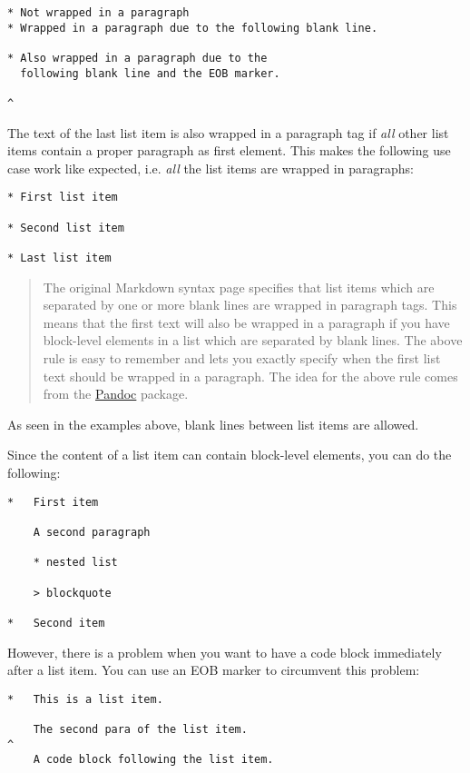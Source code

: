 \documentclass[a4paper]{article}
\begin{document}
\begin{verbatim}
* Not wrapped in a paragraph
* Wrapped in a paragraph due to the following blank line.

* Also wrapped in a paragraph due to the
  following blank line and the EOB marker.

^
\end{verbatim}

The text of the last list item is also wrapped in a paragraph tag if
\emph{all} other list items contain a proper paragraph as first element.
This makes the following use case work like expected, i.e. \emph{all}
the list items are wrapped in paragraphs:

\begin{verbatim}
* First list item

* Second list item

* Last list item
\end{verbatim}

\begin{quote}
The original Markdown syntax page specifies that list items which are
separated by one or more blank lines are wrapped in paragraph tags. This
means that the first text will also be wrapped in a paragraph if you
have block-level elements in a list which are separated by blank lines.
The above rule is easy to remember and lets you exactly specify when the
first list text should be wrapped in a paragraph. The idea for the above
rule comes from the \href{http://johnmacfarlane.net/pandoc/}{Pandoc}
package.
\end{quote}

As seen in the examples above, blank lines between list items are
allowed.

Since the content of a list item can contain block-level elements, you
can do the following:

\begin{verbatim}
*   First item

    A second paragraph

    * nested list

    > blockquote

*   Second item
\end{verbatim}

However, there is a problem when you want to have a code block
immediately after a list item. You can use an EOB marker to circumvent
this problem:

\begin{verbatim}
*   This is a list item.

    The second para of the list item.
^
    A code block following the list item.
\end{verbatim}
\end{document}

